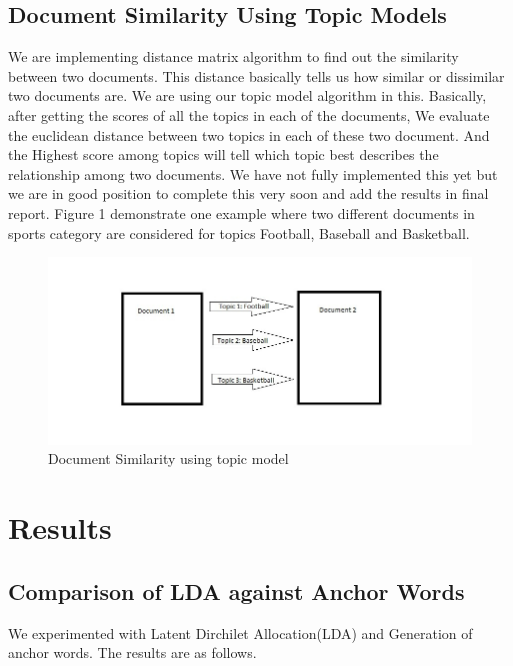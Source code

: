 \documentclass[a4paper,11pt]{article}
\begin{document}
\subsection{Document Similarity Using Topic Models}
We are implementing distance matrix algorithm to find out the similarity between two documents. This distance basically tells us how similar or dissimilar two documents are. We are using our topic model algorithm in this. Basically, after getting the scores of all the topics in each of the documents, We evaluate the euclidean distance between two topics in each of these two document. And the Highest score among topics will tell which topic best describes the relationship among two documents. We have not fully implemented this yet but we are in good position to complete this very soon and add the results in final report. Figure 1 demonstrate one example where two different documents in sports category are considered for topics Football, Baseball and Basketball. 



\begin{figure}[ht!]
\centering
\includegraphics[width=180mm]{document_similarity.jpg}
\caption{Document Similarity using topic model}
\label{overflow}
\end{figure}



\section{Results}

\subsection{Comparison of LDA against Anchor Words}

We experimented with Latent Dirchilet Allocation(LDA) and Generation of anchor words. The results are as follows. \\
\end{document}
